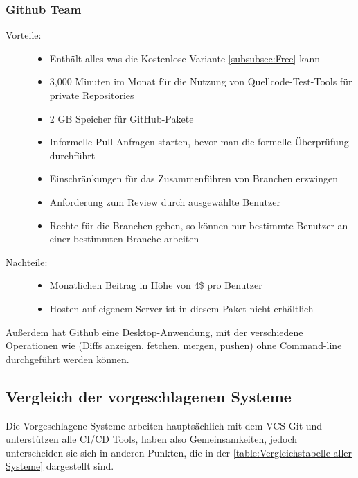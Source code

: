 \subsubsection{Github Team}
\label{subsubsec:Team}

\begin{description}
	\item [Vorteile:] \hfill
	\begin{itemize}
		\item Enthält alles was die Kostenlose Variante \cref{subsubsec:Free} kann
		\item 3,000 Minuten im Monat für die Nutzung von Quellcode-Test-Tools für private Repositories
		\item 2 GB Speicher für GitHub-Pakete
		\item Informelle Pull-Anfragen starten, bevor man die formelle Überprüfung durchführt
		\item Einschränkungen für das Zusammenführen von Branchen erzwingen
		\item Anforderung zum Review durch ausgewählte Benutzer
		\item Rechte für die Branchen geben, so können nur bestimmte Benutzer an einer bestimmten Branche arbeiten
	\end{itemize}
	\item [Nachteile:] \hfill
	\begin{itemize}
		\item Monatlichen Beitrag in Höhe von 4\$ pro Benutzer
		\item Hosten auf eigenem Server ist in diesem Paket nicht erhältlich
	\end{itemize}
\end{description}

Außerdem hat Github eine Desktop-Anwendung, mit der verschiedene Operationen wie (Diffs anzeigen, fetchen, mergen, pushen) ohne Command-line durchgeführt werden können.

\subsection{Vergleich der vorgeschlagenen Systeme}
\label{subsec:Vergleichstabelle}

Die Vorgeschlagene Systeme arbeiten hauptsächlich mit dem \ac{VCS} Git und unterstützen alle \ac{CI}/\ac{CD} Tools, haben also Gemeinsamkeiten, jedoch unterscheiden sie sich in anderen Punkten, die in der \cref{table:Vergleichstabelle aller Systeme} dargestellt sind.

